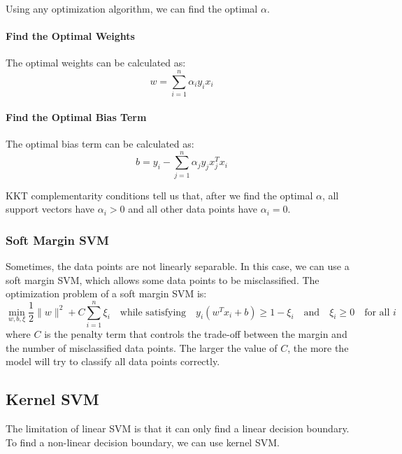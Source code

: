 \documentclass[a4paper,12pt]{article}
\begin{document}
Using any optimization algorithm, we can find the optimal $\alpha$.

\paragraph{Find the Optimal Weights} The optimal weights can be calculated as:
\begin{equation*}
  w = \sum_{i=1}^{n} \alpha_i y_i x_i
\end{equation*}

\paragraph{Find the Optimal Bias Term} The optimal bias term can be calculated as:
\begin{equation*}
  b = y_i - \sum_{j=1}^{n} \alpha_j y_j x_j^T x_i
\end{equation*}

\begin{tipsbox}
  KKT complementarity conditions tell us that, after we find the optimal $\alpha$, all support vectors have $\alpha_i > 0$ and all other data points have $\alpha_i = 0$.
\end{tipsbox}

\subsubsection{Soft Margin SVM}

Sometimes, the data points are not linearly separable. In this case, we can use a soft margin SVM, which allows some data points to be misclassified. The optimization problem of a soft margin SVM is:
\begin{equation*}
  \min_{w, b, \xi} \frac{1}{2} \|w\|^2 + C \sum_{i=1}^{n} \xi_i \quad \text{while satisfying} \quad y_i (w^T x_i + b) \geq 1 - \xi_i \quad \text{and} \quad \xi_i \geq 0 \quad \text{for all } i
\end{equation*}
where $C$ is the penalty term that controls the trade-off between the margin and the number of misclassified data points. The larger the value of $C$, the more the model will try to classify all data points correctly.

\subsection{Kernel SVM}

The limitation of linear SVM is that it can only find a linear decision boundary. To find a non-linear decision boundary, we can use kernel SVM.
\end{document}
